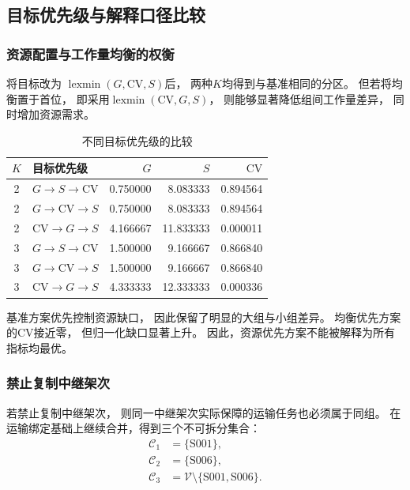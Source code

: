 \documentclass[bwprint]{gmcmthesis}
\begin{document}
\subsection{目标优先级与解释口径比较}

\subsubsection{资源配置与工作量均衡的权衡}

将目标改为
$\operatorname{lexmin}(G,\mathrm{CV},S)$后，
两种$K$均得到与基准相同的分区。
但若将均衡置于首位，
即采用$\operatorname{lexmin}(\mathrm{CV},G,S)$，
则能够显著降低组间工作量差异，
同时增加资源需求。

\begin{table}[htbp]
\centering
\caption{不同目标优先级的比较}
\label{tab:q4_priority}
\begin{tabular}{clrrr}
\toprule
$K$ & 目标优先级 & $G$ & $S$ & $\mathrm{CV}$\\
\midrule
2 & $G\rightarrow S\rightarrow\mathrm{CV}$
  &0.750000&8.083333&0.894564\\
2 & $G\rightarrow\mathrm{CV}\rightarrow S$
  &0.750000&8.083333&0.894564\\
2 & $\mathrm{CV}\rightarrow G\rightarrow S$
  &4.166667&11.833333&0.000011\\
\midrule
3 & $G\rightarrow S\rightarrow\mathrm{CV}$
  &1.500000&9.166667&0.866840\\
3 & $G\rightarrow\mathrm{CV}\rightarrow S$
  &1.500000&9.166667&0.866840\\
3 & $\mathrm{CV}\rightarrow G\rightarrow S$
  &4.333333&12.333333&0.000336\\
\bottomrule
\end{tabular}
\end{table}

基准方案优先控制资源缺口，
因此保留了明显的大组与小组差异。
均衡优先方案的$\mathrm{CV}$接近零，
但归一化缺口显著上升。
因此，资源优先方案不能被解释为所有指标均最优。

\subsubsection{禁止复制中继架次}

若禁止复制中继架次，
则同一中继架次实际保障的运输任务也必须属于同组。
在运输绑定基础上继续合并，得到三个不可拆分集合：
\begin{align}
\mathcal{C}_1&=\{\mathrm{S001}\},\\
\mathcal{C}_2&=\{\mathrm{S006}\},\\
\mathcal{C}_3&=\mathcal{V}
\setminus\{\mathrm{S001},\mathrm{S006}\}.
\end{align}
\end{document}
